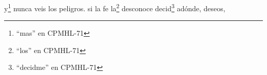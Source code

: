 y\footnote{\textsuperscript{}``mas'' en CPMHL-71} nunca veis los peligros.
si la fe la\footnote{\textsuperscript{}``los'' en CPMHL-71} desconoce
decid\footnote{\textsuperscript{}``decidme'' en CPMHL-71} adónde, deseos,
